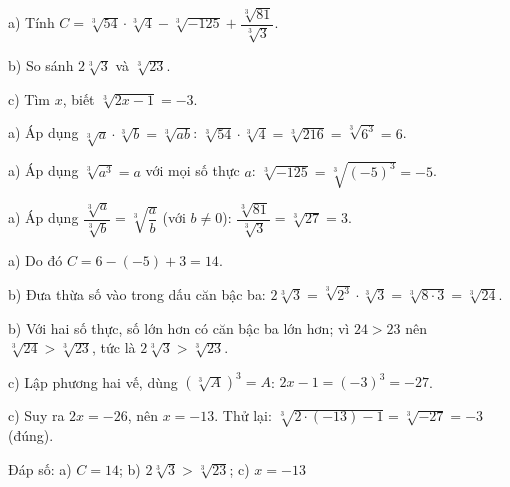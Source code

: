 \begin{problem}[9DS-CAN-006]
a) Tính $C = \sqrt[3]{54} \cdot \sqrt[3]{4} - \sqrt[3]{-125} + \dfrac{\sqrt[3]{81}}{\sqrt[3]{3}}$.

b) So sánh $2\sqrt[3]{3}$ và $\sqrt[3]{23}$.

c) Tìm $x$, biết $\sqrt[3]{2x - 1} = -3$.

\begin{solution}
a) Áp dụng $\sqrt[3]{a} \cdot \sqrt[3]{b} = \sqrt[3]{ab}$: $\sqrt[3]{54} \cdot \sqrt[3]{4} = \sqrt[3]{216} = \sqrt[3]{6^3} = 6$.

a) Áp dụng $\sqrt[3]{a^3} = a$ với mọi số thực $a$: $\sqrt[3]{-125} = \sqrt[3]{(-5)^3} = -5$.

a) Áp dụng $\dfrac{\sqrt[3]{a}}{\sqrt[3]{b}} = \sqrt[3]{\dfrac{a}{b}}$ (với $b \neq 0$): $\dfrac{\sqrt[3]{81}}{\sqrt[3]{3}} = \sqrt[3]{27} = 3$.

a) Do đó $C = 6 - (-5) + 3 = 14$.

b) Đưa thừa số vào trong dấu căn bậc ba: $2\sqrt[3]{3} = \sqrt[3]{2^3} \cdot \sqrt[3]{3} = \sqrt[3]{8 \cdot 3} = \sqrt[3]{24}$.

b) Với hai số thực, số lớn hơn có căn bậc ba lớn hơn; vì $24 > 23$ nên $\sqrt[3]{24} > \sqrt[3]{23}$, tức là $2\sqrt[3]{3} > \sqrt[3]{23}$.

c) Lập phương hai vế, dùng $\left(\sqrt[3]{A}\right)^3 = A$: $2x - 1 = (-3)^3 = -27$.

c) Suy ra $2x = -26$, nên $x = -13$. Thử lại: $\sqrt[3]{2 \cdot (-13) - 1} = \sqrt[3]{-27} = -3$ (đúng).

Đáp số: a) $\boxed{C = 14}$; b) $\boxed{2\sqrt[3]{3} > \sqrt[3]{23}}$; c) $\boxed{x = -13}$
\end{solution}
\end{problem}

